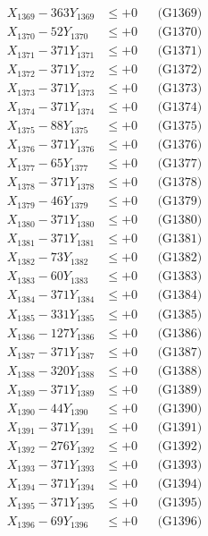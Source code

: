 \documentclass[a4paper,10pt]{article}
\begin{document}
{\begin{align}
X_{1369} - 363Y_{1369} &\leq +0 && \text{(G1369)} \\
X_{1370} - 52Y_{1370} &\leq +0 && \text{(G1370)} \\
\allowbreak
X_{1371} - 371Y_{1371} &\leq +0 && \text{(G1371)} \\
X_{1372} - 371Y_{1372} &\leq +0 && \text{(G1372)} \\
X_{1373} - 371Y_{1373} &\leq +0 && \text{(G1373)} \\
X_{1374} - 371Y_{1374} &\leq +0 && \text{(G1374)} \\
X_{1375} - 88Y_{1375} &\leq +0 && \text{(G1375)} \\
X_{1376} - 371Y_{1376} &\leq +0 && \text{(G1376)} \\
X_{1377} - 65Y_{1377} &\leq +0 && \text{(G1377)} \\
X_{1378} - 371Y_{1378} &\leq +0 && \text{(G1378)} \\
X_{1379} - 46Y_{1379} &\leq +0 && \text{(G1379)} \\
X_{1380} - 371Y_{1380} &\leq +0 && \text{(G1380)} \\
\allowbreak
X_{1381} - 371Y_{1381} &\leq +0 && \text{(G1381)} \\
X_{1382} - 73Y_{1382} &\leq +0 && \text{(G1382)} \\
X_{1383} - 60Y_{1383} &\leq +0 && \text{(G1383)} \\
X_{1384} - 371Y_{1384} &\leq +0 && \text{(G1384)} \\
X_{1385} - 331Y_{1385} &\leq +0 && \text{(G1385)} \\
X_{1386} - 127Y_{1386} &\leq +0 && \text{(G1386)} \\
X_{1387} - 371Y_{1387} &\leq +0 && \text{(G1387)} \\
X_{1388} - 320Y_{1388} &\leq +0 && \text{(G1388)} \\
X_{1389} - 371Y_{1389} &\leq +0 && \text{(G1389)} \\
X_{1390} - 44Y_{1390} &\leq +0 && \text{(G1390)} \\
\allowbreak
X_{1391} - 371Y_{1391} &\leq +0 && \text{(G1391)} \\
X_{1392} - 276Y_{1392} &\leq +0 && \text{(G1392)} \\
X_{1393} - 371Y_{1393} &\leq +0 && \text{(G1393)} \\
X_{1394} - 371Y_{1394} &\leq +0 && \text{(G1394)} \\
X_{1395} - 371Y_{1395} &\leq +0 && \text{(G1395)} \\
X_{1396} - 69Y_{1396} &\leq +0 && \text{(G1396)} \\

\end{align}}
\end{document}
